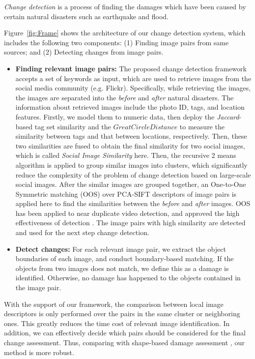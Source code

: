 \documentclass[runningheads,a4paper]{llncs}
\begin{document}
\begin{definition}
\emph{Change detection} is a process of finding the damages which have been caused by certain natural disasters such as earthquake and flood.
\end{definition}

Figure~\ref{fig:Frame} shows the architecture of our change detection system, which includes the following two components: (1) Finding image pairs from same sources; and (2) Detecting changes from image pairs.

\begin{itemize}
\item {\bf Finding relevant image pairs:} 
The proposed change detection framework accepts a set of keywords as input, 
which are used to retrieve images from the social media community (e.g. Flickr). 
Specifically, 
while retrieving the images, 
the images are separated into the \emph{before} and \emph{after} natural disasters. 
The information about retrieved images include the photo ID, tags, and location features. 
Firstly, we model them to numeric data, then deploy the \emph{Jaccard}-based tag set similarity and the $Great Circle Distance$ to measure the similarity between tags and that between locations, respectively. 
Then, these two similarities are fused to obtain the final similarity for two social images, 
which is called \emph{Social Image Similarity} here. 
Then, the recursive 2 means algorithm \cite{DBLP:conf/sigmod/ShenZH05} is applied to group similar images into clusters, 
which significantly reduce the complexity of the problem of change detection based on large-scale social images. 
After the similar images are grouped together, 
an One-to-One Symmetric matching (OOS) over PCA-SIFT descriptors of image pairs is applied here to find the similarities between the \emph{before} and \emph{after} images. 
OOS has been applied to near duplicate video detection, and approved the high effectiveness of detection \cite{DBLP:journals/tmm/ZhaoNTW07,DBLP:journals/tmm/ZhouZCBXT09}. The image pairs with high similarity are detected and used for the next step change detection.
\item {\bf Detect changes:} 
For each relevant image pair, we extract the object boundaries of each image, and conduct boundary-based matching. 
If the objects from two images does not match, we define this as a damage is identified. 
Otherwise, no damage has happened to the objects contained in the image pair.
\end{itemize}

\noindent With the support of our framework, the comparison between local image descriptors is only performed over the pairs in the same cluster or neighboring ones. 
This greatly reduces the time cost of relevant image identification. 
In addition, we can effectively decide which pairs should be considered for the final change assessment. 
Thus, 
comparing with shape-based damage assessment \cite{rs2051217}, our method is more robust.
\end{document}
